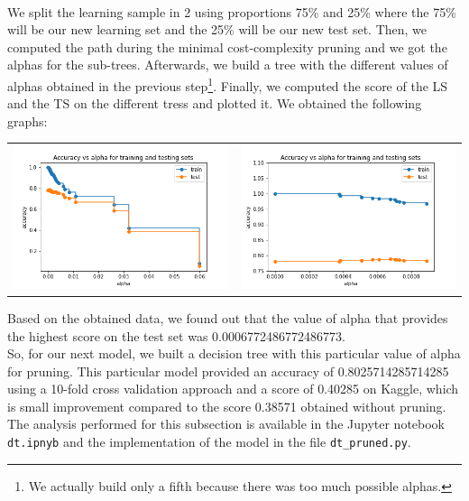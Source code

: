 \documentclass[a4paper, 11pt, oneside]{article}
\begin{document}
\paragraph{}We split the learning sample in 2 using proportions 75\% and 25\% where the 75\% will be our new learning set and the 25\% will be our new test set. Then, we computed the path during the minimal cost-complexity pruning and we got the alphas for the sub-trees. Afterwards, we build a tree with the different values of alphas obtained in the previous step\footnote{We actually build only a fifth because there was too much possible alphas.}. Finally, we computed the score of the LS and the TS on the different tress and plotted it. We obtained the following graphs:
\begin{table}[H]
\centering
\begin{tabular}{ll}
\includegraphics[scale=0.35]{dt/dt_pruning_study.png} & \includegraphics[scale=0.35]{dt/dt_pruning_study_zoomed.png}
\end{tabular}
\end{table}
Based on the obtained data, we found out that the value of alpha that provides the highest score on the test set was 0.0006772486772486773.\\
So, for our next model, we built a decision tree with this particular value of alpha for pruning. This particular model provided an accuracy of 0.8025714285714285 using a 10-fold cross validation approach and a score of 0.40285 on Kaggle, which is small improvement compared to the score 0.38571 obtained without pruning.\\
The analysis performed for this subsection is available in the Jupyter notebook \texttt{dt.ipnyb} and the implementation of the model in the file \texttt{dt\_pruned.py}.
\end{document}
